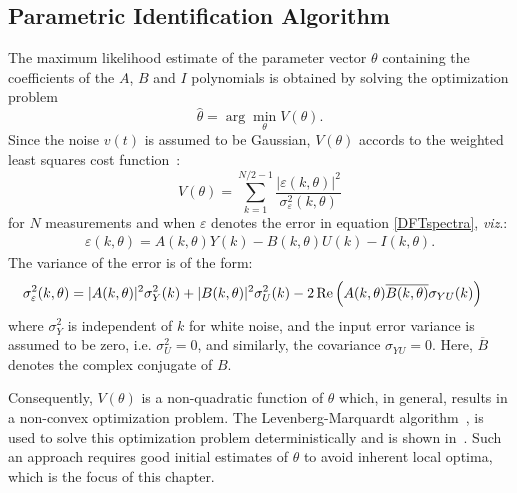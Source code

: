 \subsection{Parametric Identification Algorithm}\label{sec:initial-values:paramIdentAlgo}

The maximum likelihood estimate of the parameter vector $\theta$  containing the coefficients of the $A$, $B$ and $I$  polynomials is obtained by solving the optimization problem
\begin{equation}
  \hat{\theta} = \arg\min_\theta V(\theta) \text{.}
\end{equation}
Since the noise $v(t)$ is assumed to be Gaussian, $V(\theta)$ accords to the weighted least squares cost function~\citep[Section 9.11]{Pintelon2012}:
\begin{equation}\label{eq:MLEcf}
V(\theta) = \sum_{k=1}^{N/2-1}\frac{|\varepsilon(k,\theta)|^2}{\sigma_\varepsilon^2(k,\theta)}
\end{equation}
for $N$ measurements and when $\varepsilon$ denotes the error in equation \eqref{DFTspectra},  \emph{viz}.:
\begin{align}
\varepsilon(k,\theta) = A(k,\theta)Y(k) - B(k,\theta)U(k) - I(k,\theta)\text{.}
\end{align}
The variance of the error is of the form:
\begin{equation}\label{eq:sigmaEps}
\begin{split}
\sigma_\varepsilon^2(k,\theta) 
  &=  |A(k,\theta)|^2\sigma_Y^2(k) 
   +  |B(k,\theta)|^2\sigma_U^2(k)
  - 2\operatorname{\mathrm{Re}} \left( A(k,\theta) \overline{B(k,\theta)} \sigma_{YU}(k) \right)
\end{split}
\end{equation}
where $\sigma_Y^2$ is independent of $k$ for white noise, and the input error variance is assumed to be zero, i.e. $\sigma^2_U=0$, and similarly, the covariance $\sigma_{YU} = 0$.
Here, $\overline{B}$ denotes the complex conjugate of $B$.

Consequently, $V(\theta)$ is a non-quadratic function of $\theta$ which, in general, results in a non-convex optimization problem. 
The Levenberg-Marquardt algorithm~\citep{Marquardt1963}, is used to solve this optimization problem deterministically and is shown in~.
Such an approach requires good initial estimates of $\theta$ to avoid inherent local optima, which is the focus of this chapter.

